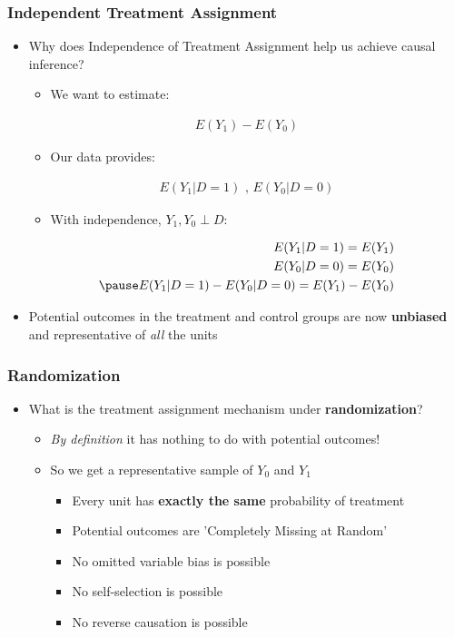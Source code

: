 \documentclass[xcolor=x11names,compress]{beamer}\usepackage[]{graphicx}\usepackage[]{color}
\renewcommand{\(}{\begin{columns}}
\renewcommand{\)}{\end{columns}}
\newcommand{\<}[1]{\begin{column}{#1}}
\renewcommand{\>}{\end{column}}
\begin{document}
\begin{frame}
\frametitle{Independent Treatment Assignment}
\begin{itemize}
\item Why does Independence of Treatment Assignment help us achieve causal inference?
\begin{itemize}
\item We want to estimate:
\end{itemize}
\begin{eqnarray}
E(Y_1) - E(Y_0)
\end{eqnarray}
\pause
\begin{itemize}
\item Our data provides:
\end{itemize}
\begin{eqnarray}
E(Y_1|D=1)\text{ ,   }E(Y_0|D=0)
\end{eqnarray}
\pause
\begin{itemize}
\item With independence, $Y_1, Y_0 \perp D$:
\end{itemize}
\begin{eqnarray}
E(Y_1|D=1) = E(Y_1) \\ 
E(Y_0|D=0) = E(Y_0) \\
\pause
E(Y_1|D=1) - E(Y_0|D=0) = E(Y_1) - E(Y_0)
\end{eqnarray}
\pause
\item Potential outcomes in the treatment and control groups are now \textbf{unbiased} and representative of \textit{all} the units
\end{itemize}
\end{frame}

\begin{frame}
\frametitle{Randomization}
\begin{itemize}
\item What is the treatment assignment mechanism under \textbf{randomization}?
\pause
\begin{itemize}
\item \textit{By definition} it has nothing to do with potential outcomes!
\pause
\item So we get a representative sample of $Y_0$ and $Y_1$
\pause
\begin{itemize}
\item Every unit has \textbf{exactly the same} probability of treatment
\pause
\item Potential outcomes are 'Completely Missing at Random'
\pause
\item No omitted variable bias is possible
\pause
\item No self-selection is possible
\pause
\item No reverse causation is possible
\end{itemize}
\end{itemize}
\end{itemize}
\end{frame}
\end{document}

